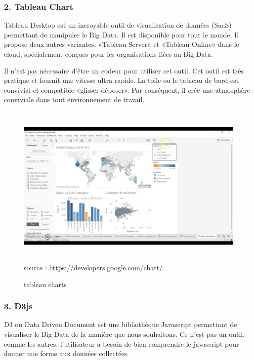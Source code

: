 \documentclass[french, a4paper, 12pt]{report}
\begin{document}
\subsubsection{2. Tableau Chart}
Tableau Desktop est un incroyable outil de visualisation de données (SaaS) permettant de manipuler le Big Data. Il est disponible pour tout le monde. Il propose deux autres variantes, «Tableau Server» et «Tableau Online» dans le cloud, spécialement conçues pour les organisations liées au Big Data.

Il n’est pas nécessaire d’être un codeur pour utiliser cet outil. Cet outil est très pratique et fournit une vitesse ultra rapide. La toile ou le tableau de bord est convivial et compatible «glisser-déposer». Par conséquent, il crée une atmosphère conviviale dans tout environnement de travail.
\begin{figure}[!htp]
    \centering
    \includegraphics[height=8cm]{images/tableau.jpg}
    \scriptsize{source : \url{https://developers.google.com/chart/}}
    \caption{tableau charts}
    \label{fig:2.14}
\end{figure}
\subsubsection{3. D3js}
D3 ou Data Driven Document est une bibliothèque Javascript permettant de visualiser le Big Data de la manière que nous souhaitons. Ce n'est pas un outil, comme les autres, l'utilisateur a besoin de bien comprendre le javascript pour donner une forme aux données collectées. 
\end{document}
